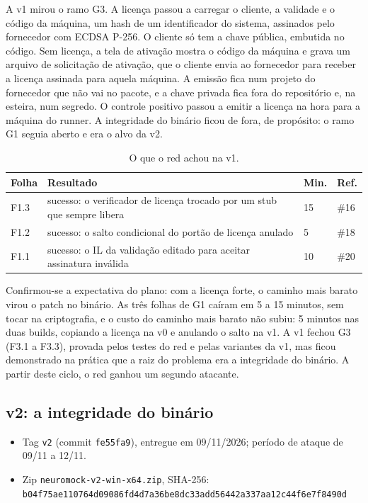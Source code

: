 A v1 mirou o ramo G3. A licença passou a carregar o cliente, a validade e o código da máquina, um hash de um identificador do sistema, assinados pelo fornecedor com ECDSA P-256. O cliente só tem a chave pública, embutida no código. Sem licença, a tela de ativação mostra o código da máquina e grava um arquivo de solicitação de ativação, que o cliente envia ao fornecedor para receber a licença assinada para aquela máquina. A emissão fica num projeto do fornecedor que não vai no pacote, e a chave privada fica fora do repositório e, na esteira, num segredo. O controle positivo passou a emitir a licença na hora para a máquina do runner. A integridade do binário ficou de fora, de propósito: o ramo G1 seguia aberto e era o alvo da v2.

\begin{table}[htbp]
\centering
\caption{O que o red achou na v1.}
\label{qd:v1}
\small
\begin{tabular}{L{1.2cm}L{10.2cm}L{1.2cm}L{1.2cm}}
\toprule
Folha & Resultado & Min. & Ref. \\
\midrule
F1.3 & sucesso: o verificador de licença trocado por um stub que sempre libera & 15 & \#16 \\
F1.2 & sucesso: o salto condicional do portão de licença anulado & 5 & \#18 \\
F1.1 & sucesso: o IL da validação editado para aceitar assinatura inválida & 10 & \#20 \\
\bottomrule
\end{tabular}
\end{table}

Confirmou-se a expectativa do plano: com a licença forte, o caminho mais barato virou o patch no binário. As três folhas de G1 caíram em 5 a 15 minutos, sem tocar na criptografia, e o custo do caminho mais barato não subiu: 5 minutos nas duas builds, copiando a licença na v0 e anulando o salto na v1. A v1 fechou G3 (F3.1 a F3.3), provada pelos testes do red e pelas variantes da v1, mas ficou demonstrado na prática que a raiz do problema era a integridade do binário. A partir deste ciclo, o red ganhou um segundo atacante.

\subsection{v2: a integridade do binário}

\begin{itemize}[noitemsep]
\item Tag \texttt{v2} (commit \texttt{fe55fa9}), entregue em 09/11/2026; período de ataque de 09/11 a 12/11.
\item Zip \texttt{neuromock-v2-win-x64.zip}, SHA-256:\\ \texttt{\footnotesize b04f75ae110764d09086fd4d7a36be8dc33add56442a337aa12c44f6e7f8490d}
\end{itemize}

